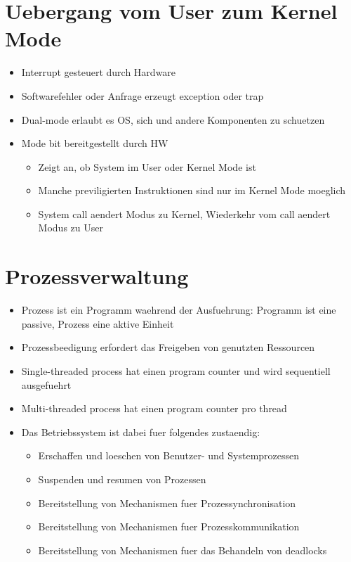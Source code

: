 \documentclass[a4paper]{scrreprt}
\begin{document}
\section{Uebergang vom User zum Kernel Mode}
\begin{itemize}
	\item Interrupt gesteuert durch Hardware
	\item Softwarefehler oder Anfrage erzeugt exception oder trap
	\item Dual-mode erlaubt es OS, sich und andere Komponenten zu schuetzen
	\item Mode bit bereitgestellt durch HW
		\begin{itemize}
			\item Zeigt an, ob System im User oder Kernel Mode ist
			\item Manche previligierten Instruktionen sind nur im Kernel Mode moeglich
			\item System call aendert Modus zu Kernel, Wiederkehr vom call aendert Modus zu User
		\end{itemize}
\end{itemize}

\section{Prozessverwaltung}
\begin{itemize}
	\item Prozess ist ein Programm waehrend der Ausfuehrung: Programm ist eine passive, Prozess eine aktive Einheit
	\item Prozessbeedigung erfordert das Freigeben von genutzten Ressourcen
	\item Single-threaded process hat einen program counter und wird sequentiell ausgefuehrt
	\item Multi-threaded process hat einen program counter pro thread
	\item Das Betriebssystem ist dabei fuer folgendes zustaendig:
		\begin{itemize}
			\item Erschaffen und loeschen von Benutzer- und Systemprozessen
			\item Suspenden und resumen von Prozessen
			\item Bereitstellung von Mechanismen fuer Prozessynchronisation
			\item Bereitstellung von Mechanismen fuer Prozesskommunikation
			\item Bereitstellung von Mechanismen fuer das Behandeln von deadlocks
		\end{itemize}
\end{itemize}
\end{document}
